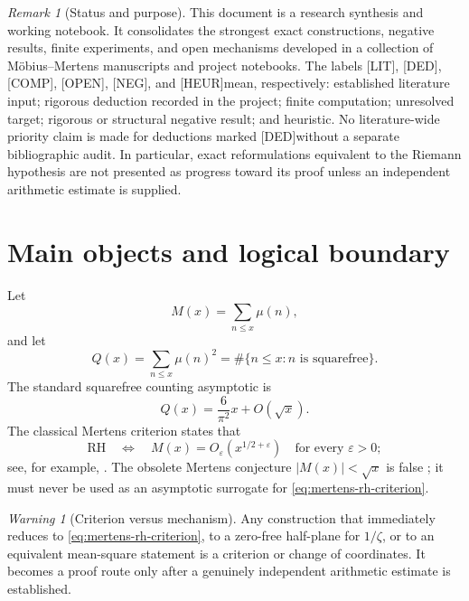 \documentclass[11pt]{amsart}
\numberwithin{equation}{section}
\theoremstyle{plain}
\theoremstyle{definition}
\theoremstyle{remark}
\newtheorem{remark}[theorem]{Remark}
\newtheorem{warning}[theorem]{Warning}
\newcommand{\Mert}{M}
\newcommand{\Mob}{\mu}
\newcommand{\Sq}{Q}
\newcommand{\eps}{\varepsilon}
\newcommand{\LIT}{\textup{[LIT]}}
\newcommand{\DED}{\textup{[DED]}}
\newcommand{\COMP}{\textup{[COMP]}}
\newcommand{\OPEN}{\textup{[OPEN]}}
\newcommand{\NEG}{\textup{[NEG]}}
\newcommand{\HEUR}{\textup{[HEUR]}}
\begin{document}
\begin{remark}[Status and purpose]
\label{rem:status-purpose}
This document is a research synthesis and working notebook.  It consolidates the strongest exact constructions, negative results, finite experiments, and open mechanisms developed in a collection of M\"obius--Mertens manuscripts and project notebooks.  The labels \LIT, \DED, \COMP, \OPEN, \NEG, and \HEUR mean, respectively: established literature input; rigorous deduction recorded in the project; finite computation; unresolved target; rigorous or structural negative result; and heuristic.  No literature-wide priority claim is made for deductions marked \DED without a separate bibliographic audit.  In particular, exact reformulations equivalent to the Riemann hypothesis are not presented as progress toward its proof unless an independent arithmetic estimate is supplied.
\end{remark}



\section{Main objects and logical boundary}
\label{sec:main-objects}

Let
\begin{equation}
\Mert(x)=\sum_{n\le x}\Mob(n),
\label{eq:mertens-definition}
\end{equation}
and let
\begin{equation}
\Sq(x)=\sum_{n\le x}\Mob(n)^2
=\#\{n\le x:n\text{ is squarefree}\}.
\label{eq:squarefree-count}
\end{equation}
The standard squarefree counting asymptotic is
\begin{equation}
\Sq(x)=\frac{6}{\pi^2}x+O(\sqrt x).
\label{eq:squarefree-asymptotic}
\end{equation}
The classical Mertens criterion states that
\begin{equation}
\mathrm{RH}
\quad\Longleftrightarrow\quad
\Mert(x)=O_{\eps}(x^{1/2+\eps})
\quad\text{for every }\eps>0;
\label{eq:mertens-rh-criterion}
\end{equation}
see, for example, \cite{Titchmarsh1986}.  The obsolete Mertens conjecture
$|\Mert(x)|<\sqrt x$ is false \cite{OdlyzkoTeRiele1985}; it must never be used as an
asymptotic surrogate for \eqref{eq:mertens-rh-criterion}.

\begin{warning}[Criterion versus mechanism]
\label{warn:criterion-mechanism}
Any construction that immediately reduces to \eqref{eq:mertens-rh-criterion}, to a
zero-free half-plane for $1/\zeta$, or to an equivalent mean-square statement is a
criterion or change of coordinates.  It becomes a proof route only after a genuinely
independent arithmetic estimate is established.
\end{warning}
\end{document}
